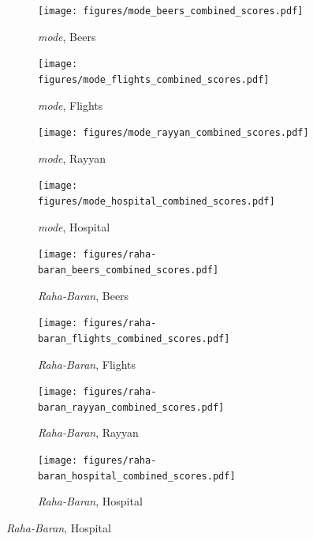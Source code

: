 \documentclass[10pt]{article} %
\numberwithin{equation}{section}
\begin{document}
\begin{figure}[htbp]
  \centering
  \footnotesize %
  \setlength{\abovecaptionskip}{2pt} %
  \setlength{\belowcaptionskip}{0pt} %

  \begin{subfigure}{0.48\linewidth} %
    \centering
    \texttt{[image: figures/mode\_beers\_combined\_scores.pdf]}
    \caption{\textit{mode}, Beers}
    \label{fig:mode_beers}
  \end{subfigure}
  \hfill
  \begin{subfigure}{0.48\linewidth}
    \centering
    \texttt{[image: figures/mode\_flights\_combined\_scores.pdf]}
    \caption{\textit{mode}, Flights}
    \label{fig:mode_flights}
  \end{subfigure}

  \vspace{0.2em} %

  \begin{subfigure}{0.48\linewidth}
    \centering
    \texttt{[image: figures/mode\_rayyan\_combined\_scores.pdf]}
    \caption{\textit{mode}, Rayyan}
    \label{fig:mode_rayyan}
  \end{subfigure}
  \hfill
  \begin{subfigure}{0.48\linewidth}
    \centering
    \texttt{[image: figures/mode\_hospital\_combined\_scores.pdf]}
    \caption{\textit{mode}, Hospital}
    \label{fig:mode_hospital}
  \end{subfigure}

  \vspace{0.2em} %

  \begin{subfigure}{0.48\linewidth}
    \centering
    \texttt{[image: figures/raha-baran\_beers\_combined\_scores.pdf]}
    \caption{\textit{Raha-Baran}, Beers}
    \label{fig:raha_baran_beers}
  \end{subfigure}
  \hfill
  \begin{subfigure}{0.48\linewidth}
    \centering
    \texttt{[image: figures/raha-baran\_flights\_combined\_scores.pdf]}
    \caption{\textit{Raha-Baran}, Flights}
    \label{fig:raha_baran_flights}
  \end{subfigure}

  \vspace{0.2em} %

  \begin{subfigure}{0.48\linewidth}
    \centering
    \texttt{[image: figures/raha-baran\_rayyan\_combined\_scores.pdf]}
    \caption{\textit{Raha-Baran}, Rayyan}
    \label{fig:raha_baran_rayyan}
  \end{subfigure}
  \hfill
  \begin{subfigure}{0.48\linewidth}
    \centering
    \texttt{[image: figures/raha-baran\_hospital\_combined\_scores.pdf]}
    \caption{\textit{Raha-Baran}, Hospital}
    \label{fig:raha_baran_hospital}
  \end{subfigure}


\end{figure}
\end{document}
